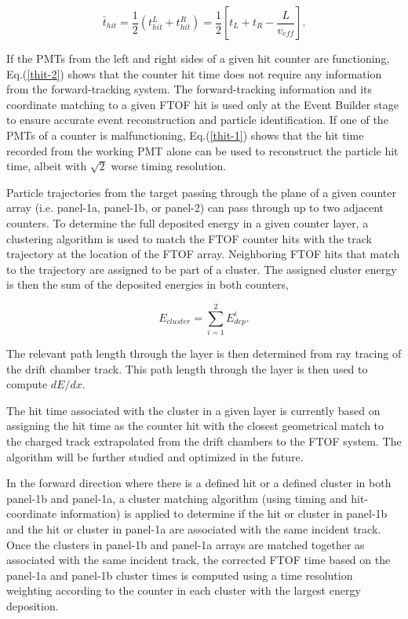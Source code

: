 \documentclass{elsart}
\begin{document}
\begin{equation}
\label{thit-2}
\bar{t}_{hit} = \frac{1}{2} ( t_{hit}^L + t_{hit}^R ) = \frac{1}{2} \left[ t_L + t_R - \frac{L}{v_{eff}} \right].
\end{equation}

If the PMTs from the left and right sides of a given hit counter are functioning, Eq.(\ref{thit-2}) shows that
the counter hit time does not require any information from the forward-tracking system. The forward-tracking
information and its coordinate matching to a given FTOF hit is used only at the Event Builder stage to ensure
accurate event reconstruction and particle identification. If one of the PMTs of a counter is malfunctioning,
Eq.(\ref{thit-1}) shows that the hit time recorded from the working PMT alone can be used to reconstruct the
particle hit time, albeit with $\sqrt{2}$ worse timing resolution.

Particle trajectories from the target passing through the plane of a given counter array (i.e. panel-1a,
panel-1b, or panel-2) can pass through up to two adjacent counters. To determine the full deposited
energy in a given counter layer, a clustering algorithm is used to match the FTOF counter hits with
the track trajectory at the location of the FTOF array. Neighboring FTOF hits that match to the
trajectory are assigned to be part of a cluster. The assigned cluster energy is then the sum of the
deposited energies in both counters,

\begin{equation}
  E_{cluster} = \sum_{i=1}^{2} E_{dep}^i.
\end{equation}

\noindent
The relevant path length through the layer is then determined from ray tracing of the drift chamber
track. This path length through the layer is then used to compute $dE/dx$.

The hit time associated with the cluster in a given layer is currently based on assigning the hit time as
the counter hit with the closest geometrical match to the charged track extrapolated from the drift
chambers to the FTOF system. The algorithm will be further studied and optimized in the future.

In the forward direction where there is a defined hit or a defined cluster in both panel-1b and panel-1a,
a cluster matching algorithm (using timing and hit-coordinate information) is applied to determine if the
hit or cluster in panel-1b and the hit or cluster in panel-1a are associated with the same incident track.
Once the clusters in panel-1b and panel-1a arrays are matched together as associated with the same
incident track, the corrected FTOF time based on the panel-1a and panel-1b cluster times is computed using
a time resolution weighting according to the counter in each cluster with the largest energy deposition.
\end{document}
